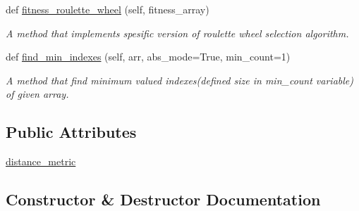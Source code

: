 \begin{DoxyCompactItemize}
def \hyperlink{classStreamClusteringAlgorithms_1_1evoStream_1_1v1_1_1Utils_1_1Utils_1_1UtilInterface_adeedb8f53e6291cc98718300f5bdfc8c}{fitness\+\_\+roulette\+\_\+wheel} (self, fitness\+\_\+array)
\begin{DoxyCompactList}\small\item\em A method that implements spesific version of roulette wheel selection algorithm. \end{DoxyCompactList}\item 
def \hyperlink{classStreamClusteringAlgorithms_1_1evoStream_1_1v1_1_1Utils_1_1Utils_1_1UtilInterface_a7b462b054952e41d6698aa70193bd585}{find\+\_\+min\+\_\+indexes} (self, arr, abs\+\_\+mode=True, min\+\_\+count=1)
\begin{DoxyCompactList}\small\item\em A method that find minimum valued indexes(defined size in min\+\_\+count variable) of given array. \end{DoxyCompactList}\end{DoxyCompactItemize}
\subsection*{Public Attributes}
\begin{DoxyCompactItemize}
\item 
\hyperlink{classStreamClusteringAlgorithms_1_1evoStream_1_1v1_1_1Utils_1_1Utils_1_1UtilInterface_a2a5442065af95e98450ef8074c3b34bf}{distance\+\_\+metric}
\end{DoxyCompactItemize}


\subsection{Constructor \& Destructor Documentation}
\mbox{\label{classStreamClusteringAlgorithms_1_1evoStream_1_1v1_1_1Utils_1_1Utils_1_1UtilInterface_a1da0b7cc382fe2d4de73ce2d9bf0ee50}} 
